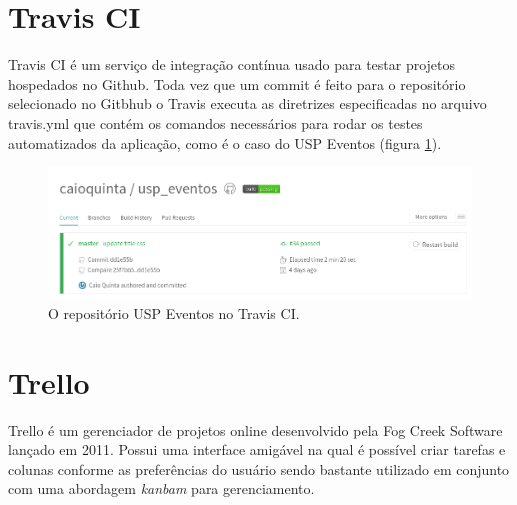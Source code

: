 \section{Travis CI}
\par Travis CI é um serviço de integração contínua usado para testar projetos hospedados no Github. Toda vez que um commit é feito para o repositório selecionado no Gitbhub o Travis executa as diretrizes especificadas no arquivo travis.yml que contém os comandos necessários para rodar os testes automatizados da aplicação, como é o caso do USP Eventos (figura \ref{fig:travis}).
\begin{figure}[htb]
\centering
\includegraphics[width=15cm]{figuras/travis}
\caption{\label{fig:travis} O repositório USP Eventos no Travis CI.}
\end{figure}

\section{Trello}
\par Trello é um gerenciador de projetos online desenvolvido pela Fog Creek Software lançado em 2011. Possui uma interface amigável na qual é possível criar tarefas e colunas conforme as preferências do usuário sendo bastante utilizado em conjunto com uma abordagem \emph{kanbam} para gerenciamento.

